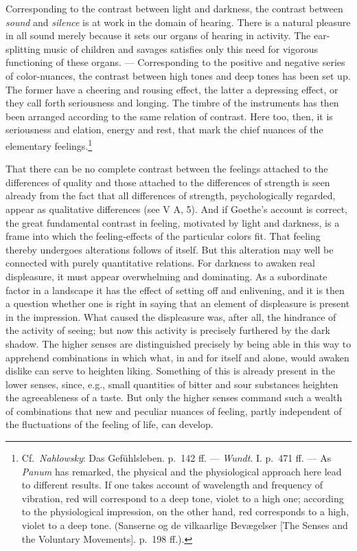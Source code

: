 \documentclass[12pt,a4paper]{book}
\newcommand{\opage}[1]{\marginnote{\footnotesize\textit{[#1]}}}
\begin{document}
Corresponding to the contrast between light and darkness, the contrast
between \emph{sound} and \emph{silence} is at work in the domain of
hearing. There is a natural pleasure in all sound merely because it sets
our organs of hearing in activity. The ear-splitting music of children
and savages satisfies only this need for vigorous functioning of these
organs. --- Corresponding to the positive and negative series of
color-nuances, the contrast between high tones and deep tones has been
set up. The former have a cheering and rousing effect, the latter a
depressing effect, or they call forth seriousness and longing. The
timbre of the instruments has then been arranged according to the same
relation of contrast. Here too, then, it is seriousness and elation,
energy and rest, that mark the chief nuances of the elementary
feelings.\footnote{Cf.\ \emph{Nahlowsky}: Das Gefühlsleben. p.~142 ff.
--- \emph{Wundt}. I. p.~471 ff. --- As \emph{Panum} has remarked, the
physical and the physiological approach here lead to different results.
If one takes account of wavelength and frequency of vibration, red will
correspond to a deep tone, violet to a high one; according to the
physiological impression, on the other hand, red corresponds to a high,
violet to a deep tone. (Sanserne og de vilkaarlige Bevægelser [The
Senses and the Voluntary Movements]. p.~198 ff.).}

That there can be no complete contrast between the feelings attached to
the differences of quality and those attached to the differences of
strength is seen already from the fact that all differences of strength,
psychologically regarded, appear as qualitative differences (see V A,
5). And if Goethe's account is correct, the great fundamental contrast
in feeling, motivated by light and darkness, is a frame into which the
feeling-effects of the particular colors fit. That feeling thereby
undergoes alterations follows of itself. But this alteration may well be
connected with purely quantitative relations. For darkness to awaken
real displeasure, it must appear overwhelming and dominating. As a
subordinate factor in a landscape it has the effect of setting off and
enlivening, and it is then a question whether one is right in saying
that an element of displeasure is present in the impression. What
caused the displeasure was, after all,
\opage{280}the hindrance of the activity of seeing; but now this activity
is precisely furthered by the dark shadow. The higher senses are
distinguished precisely by being able in this way to apprehend
combinations in which what, in and for itself and alone, would awaken
dislike can serve to heighten liking. Something of this is already
present in the lower senses, since, e.g., small quantities of bitter
and sour substances heighten the agreeableness of a taste. But only the
higher senses command such a wealth of combinations that new and
peculiar nuances of feeling, partly independent of the fluctuations of
the feeling of life, can develop.
\end{document}
